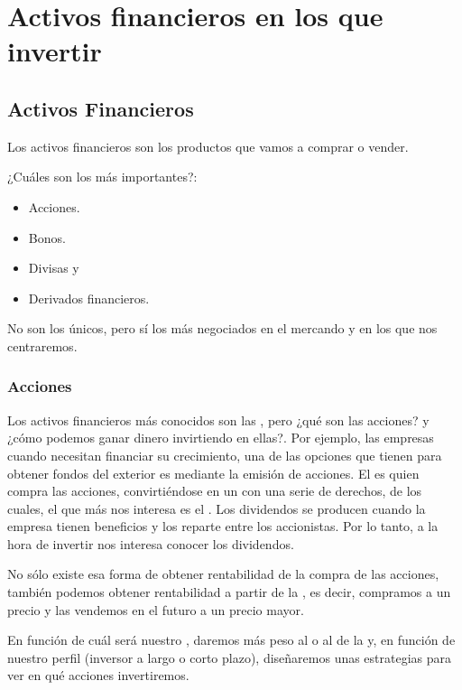 \chapter{Activos financieros en los que invertir}


\section{Activos Financieros}

Los activos financieros son los productos que vamos a comprar o vender.

¿Cuáles son los más importantes?:
\begin{itemize}
    \item Acciones.
    \item Bonos.
    \item Divisas y 
    \item Derivados financieros.
\end{itemize}
No son los únicos, pero sí los más negociados en el mercando y en los que nos centraremos.

\subsection{Acciones}


Los activos financieros más conocidos son las , pero ¿qué son las acciones? y ¿cómo podemos ganar dinero invirtiendo en ellas?. Por ejemplo, las empresas cuando necesitan financiar su crecimiento, una de las opciones que tienen para obtener fondos del exterior es mediante la emisión de acciones. El  es quien compra las acciones, convirtiéndose en un  con una serie de derechos, de los cuales, el que más nos interesa es el . Los dividendos se producen cuando la empresa tienen beneficios y los reparte entre los accionistas. Por lo tanto, a la hora de invertir nos interesa conocer los dividendos.

No sólo existe esa forma de obtener rentabilidad de la compra de las acciones, también podemos obtener rentabilidad a partir de la , es decir, compramos a un precio y las vendemos en el futuro a un precio mayor. 

En función de cuál será nuestro , daremos más peso al  o al de la  y, en función de nuestro perfil (inversor a largo o corto plazo), diseñaremos unas estrategias para ver en qué acciones invertiremos.

